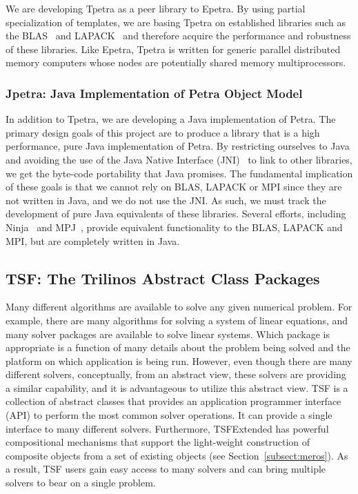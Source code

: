 \documentclass[acmtoms,acmnow]{acmtrans2m}
\begin{document}
We are developing Tpetra as a peer library to Epetra. By using partial
specialization of templates, we are basing Tpetra on established libraries 
such as the BLAS~\cite{BLAS1,BLAS2,BLAS3} and LAPACK~\cite{lapack} and 
therefore acquire the performance and robustness of these libraries.
Like Epetra, Tpetra is written for generic parallel distributed
memory computers whose nodes are
potentially shared memory multiprocessors.

\subsubsection{Jpetra: Java Implementation of Petra Object Model}

In addition to Tpetra, we are developing a Java implementation of Petra.  
The primary design goals of this project are to produce a library that 
is a high performance, pure Java implementation of Petra.  By restricting 
ourselves to Java and avoiding the use of the Java Native Interface 
(JNI)~\cite{JNI-site} to link to other libraries, we get the byte-code 
portability that Java promises.  The fundamental implication of these 
goals is that we cannot rely on BLAS, 
LAPACK or MPI since they are not written in 
Java, and we do not use the JNI.  As such, we must track the development 
of pure Java equivalents of these libraries.  Several efforts, including 
Ninja~\cite{MoreMidkGuptArtiWuAlma2001} and 
MPJ~\cite{CarpGetoJuddSkjeFox2000}, provide equivalent functionality 
to the BLAS, LAPACK and MPI, but are completely written in Java.

\subsection{TSF: The Trilinos Abstract Class Packages}

Many different algorithms are available to solve any given numerical
problem.  For example, there are many algorithms for solving a system
of linear equations, and many solver packages are available to solve
linear systems.  Which package is appropriate is a function of
many details about the problem being solved and the platform on which
application is being run. However, even though
there are many different solvers, conceptually, from an abstract view,
these solvers are providing a similar capability, and it is
advantageous to utilize this abstract view.
TSF is a collection of abstract classes that provides an application
programmer interface (API) to perform the most common solver
operations.  It can provide a single interface to many different
solvers.  Furthermore, TSFExtended has powerful compositional
mechanisms that support the
light-weight construction of composite objects from a set of
existing objects (see Section~\ref{subsect:meros}).
As a result, TSF users gain easy access to many
solvers and can bring multiple solvers to bear on a single problem.
\end{document}
